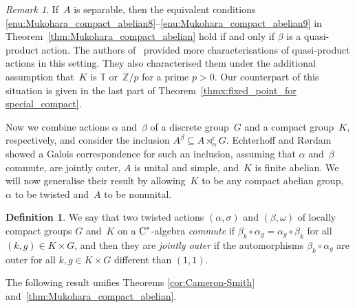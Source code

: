 \documentclass[a4paper]{amsart}
\theoremstyle{plain}
\theoremstyle{definition}
\newtheorem{definition}[theorem]{Definition}
\theoremstyle{remark}
\newtheorem{remark}[theorem]{Remark}
\numberwithin{theorem}{section}
\numberwithin{equation}{section}
\newcommand*{\nb}{\nobreakdash}
\newcommand*{\Z}{\mathbb Z}
\newcommand*{\T}{\mathbb T}%
\newcommand*{\red}{\mathrm{r}}%
\newcommand*{\Cst}{\textup C^*}%
\newcommand*{\Ad}{\textup{Ad}}%
\begin{document}
\begin{remark}
  If~\(A\) is separable, then the equivalent conditions
  \ref{enu:Mukohara_compact_abelian8}--\ref{enu:Mukohara_compact_abelian9}
  in Theorem~\ref{thm:Mukohara_compact_abelian} hold if and only if \(\beta\) is a quasi-product action.
  The authors of~\cite{Bratteli-Elliott-Evans-Kishimoto:Quasi-product}
  provided more characterisations of quasi-product actions in this
  setting.
  They also characterised them under the additional assumption
  that~\(K\) is \(\T\) or~\(\Z/p\) for a prime \(p>0\).
  Our counterpart of this situation is given in the last part of Theorem~\ref{thmx:fixed_point_for special_compact}.
\end{remark}

Now we combine actions \(\alpha\) and~\(\beta\) of a discrete
group~\(G\) and a compact group~\(K\), respectively, and consider the
inclusion \(A^\beta\subseteq A\rtimes_\alpha^\red G\).
Echterhoff and Rørdam~\cite{Echterhoff-Rordam:Inclusions} showed a
Galois correspondence for such an inclusion, assuming that
\(\alpha\) and~\(\beta\) commute, are jointly outer, \(A\) is unital
and simple, and~\(K\) is finite abelian.
We will now generalise their result by allowing~\(K\) to be any
compact abelian group, \(\alpha\) to be twisted and~\(A\) to be
nonunital.

\begin{definition}
  We say that two twisted actions \((\alpha,\sigma)\) and
  \((\beta,\omega)\) of locally compact groups \(G\) and~\(K\) on a
  \(\Cst\)\nb-algebra \emph{commute} if \(\beta_k\circ
  \alpha_g=\alpha_g\circ \beta_k\) for all \((k,g)\in K\times G\), and
  then they are \emph{jointly outer} if the automorphisms
  \(\beta_k\circ \alpha_g\) are outer for all \(k,g\in K\times G\)
  different than \((1,1)\).
\end{definition}

The following result unifies Theorems \ref{cor:Cameron-Smith}
and~\ref{thm:Mukohara_compact_abelian}.
\end{document}
